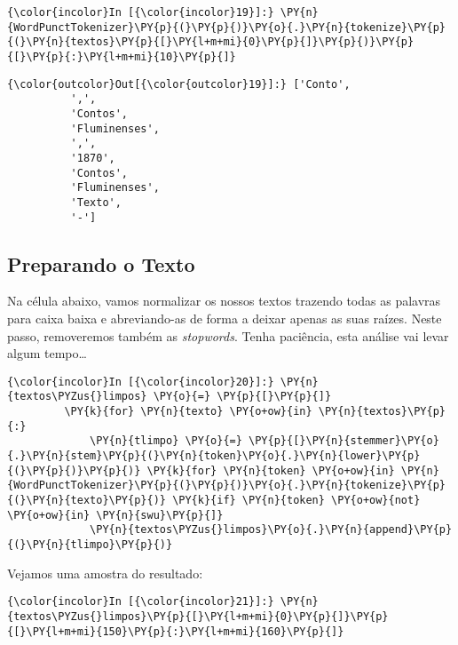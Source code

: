     \begin{Verbatim}[commandchars=\\\{\}]
{\color{incolor}In [{\color{incolor}19}]:} \PY{n}{WordPunctTokenizer}\PY{p}{(}\PY{p}{)}\PY{o}{.}\PY{n}{tokenize}\PY{p}{(}\PY{n}{textos}\PY{p}{[}\PY{l+m+mi}{0}\PY{p}{]}\PY{p}{)}\PY{p}{[}\PY{p}{:}\PY{l+m+mi}{10}\PY{p}{]}
\end{Verbatim}

            \begin{Verbatim}[commandchars=\\\{\}]
{\color{outcolor}Out[{\color{outcolor}19}]:} ['Conto',
          ',',
          'Contos',
          'Fluminenses',
          ',',
          '1870',
          'Contos',
          'Fluminenses',
          'Texto',
          '-']
\end{Verbatim}
        
    \subsection{Preparando o Texto}\label{preparando-o-texto}

Na célula abaixo, vamos normalizar os nossos textos trazendo todas as
palavras para caixa baixa e abreviando-as de forma a deixar apenas as
suas raízes. Neste passo, removeremos também as \emph{stopwords}. Tenha
paciência, esta análise vai levar algum tempo\ldots{}

    \begin{Verbatim}[commandchars=\\\{\}]
{\color{incolor}In [{\color{incolor}20}]:} \PY{n}{textos\PYZus{}limpos} \PY{o}{=} \PY{p}{[}\PY{p}{]}
         \PY{k}{for} \PY{n}{texto} \PY{o+ow}{in} \PY{n}{textos}\PY{p}{:}
             \PY{n}{tlimpo} \PY{o}{=} \PY{p}{[}\PY{n}{stemmer}\PY{o}{.}\PY{n}{stem}\PY{p}{(}\PY{n}{token}\PY{o}{.}\PY{n}{lower}\PY{p}{(}\PY{p}{)}\PY{p}{)} \PY{k}{for} \PY{n}{token} \PY{o+ow}{in} \PY{n}{WordPunctTokenizer}\PY{p}{(}\PY{p}{)}\PY{o}{.}\PY{n}{tokenize}\PY{p}{(}\PY{n}{texto}\PY{p}{)} \PY{k}{if} \PY{n}{token} \PY{o+ow}{not} \PY{o+ow}{in} \PY{n}{swu}\PY{p}{]}
             \PY{n}{textos\PYZus{}limpos}\PY{o}{.}\PY{n}{append}\PY{p}{(}\PY{n}{tlimpo}\PY{p}{)}
\end{Verbatim}

    Vejamos uma amostra do resultado:

    \begin{Verbatim}[commandchars=\\\{\}]
{\color{incolor}In [{\color{incolor}21}]:} \PY{n}{textos\PYZus{}limpos}\PY{p}{[}\PY{l+m+mi}{0}\PY{p}{]}\PY{p}{[}\PY{l+m+mi}{150}\PY{p}{:}\PY{l+m+mi}{160}\PY{p}{]}
\end{Verbatim}

